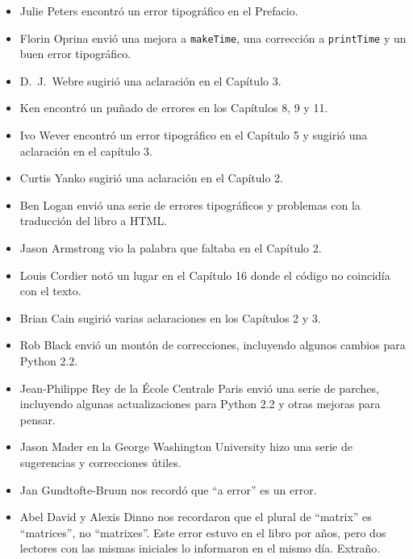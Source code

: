 \documentclass[10pt]{book}
\begin{document}
\begin{itemize}
\item Julie Peters encontró un error tipográfico en el Prefacio.

\item Florin Oprina envió una mejora a {\tt makeTime},
una corrección a {\tt printTime} y un buen error tipográfico.

\item D.~J.~Webre sugirió una aclaración en el Capítulo 3.

\item Ken encontró un puñado de errores en los Capítulos 8, 9 y 11.

\item Ivo Wever encontró un error tipográfico en el Capítulo 5 y sugirió una aclaración
en el capítulo 3.

\item Curtis Yanko sugirió una aclaración en el Capítulo 2.

\item Ben Logan envió una serie de errores tipográficos y problemas con la traducción
del libro a HTML.

\item Jason Armstrong vio la palabra que faltaba en el Capítulo 2.

\item Louis Cordier notó un lugar en el Capítulo 16 donde el código
no coincidía con el texto.

\item Brian Cain sugirió varias aclaraciones en los Capítulos 2 y 3.

\item Rob Black envió un montón de correcciones, incluyendo algunos
cambios para Python 2.2.

\item Jean-Philippe Rey de la \'{E}cole Centrale
Paris envió una serie de parches, incluyendo algunas actualizaciones para Python 2.2
y otras mejoras para pensar.

\item Jason Mader en la George Washington University hizo una serie 
de sugerencias y correcciones útiles.

\item Jan Gundtofte-Bruun nos recordó que ``a error'' es un error.

\item Abel David y Alexis Dinno nos recordaron que el plural de
``matrix'' es ``matrices'', no ``matrixes''.  Este error estuvo en el
libro por años, pero dos lectores con las mismas iniciales lo informaron en
el mismo día. Extraño.


\end{itemize}
\end{document}
